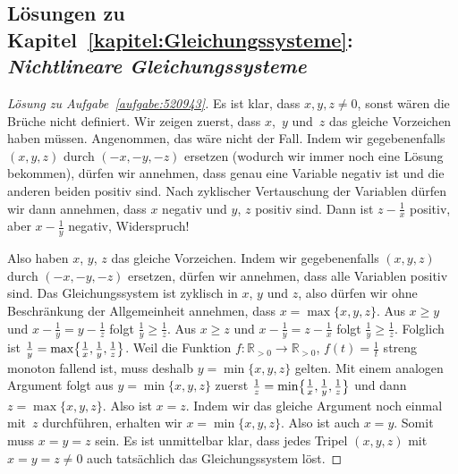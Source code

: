 \subsection*{Lösungen zu Kapitel~\ref{kapitel:Gleichungssysteme}: \emph{Nichtlineare Gleichungssysteme}}

\begin{proof}[Lösung zu Aufgabe~\ref{aufgabe:520943}]
	Es ist klar, dass $x,y,z\neq 0$, sonst wären die Brüche nicht definiert. Wir zeigen zuerst, dass $x$,~$y$ und~$z$ das gleiche Vorzeichen haben müssen. Angenommen, das wäre nicht der Fall. Indem wir gegebenenfalls $(x,y,z)$ durch $(-x,-y,-z)$ ersetzen (wodurch wir immer noch eine Lösung bekommen), dürfen wir annehmen, dass genau eine Variable negativ ist und die anderen beiden positiv sind. Nach zyklischer Vertauschung der Variablen dürfen wir dann annehmen, dass $x$ negativ und $y$, $z$ positiv sind. Dann ist $z-\frac 1x$ positiv, aber $x-\frac 1y$ negativ, Widerspruch!
	
	Also haben $x$, $y$, $z$ das gleiche Vorzeichen. Indem wir gegebenenfalls $(x,y,z)$ durch $(-x,-y,-z)$ ersetzen, dürfen wir annehmen, dass alle Variablen positiv sind. Das Gleichungssystem ist zyklisch in $x$, $y$ und $z$, also dürfen wir ohne Beschränkung der Allgemeinheit annehmen, dass $x=\max\{x,y,z\}$. Aus $x\geqslant y$ und $x-\frac 1y=y-\frac 1z$ folgt $\frac 1y\geqslant \frac 1z$. Aus $x\geqslant z$ und $x-\frac 1y=z-\frac 1x$ folgt $\frac 1y\geqslant \frac 1z$. Folglich ist $\frac 1y=\max\braces[\big]{\frac 1x,\frac 1y,\frac 1z}$. Weil die Funktion $f\colon \mathbb R_{>0}\rightarrow \mathbb R_{>0}$, $f(t)=\frac 1t$ streng monoton fallend ist, muss deshalb $y=\min\{x,y,z\}$ gelten. Mit einem analogen Argument folgt aus $y=\min\{x,y,z\}$ zuerst $\frac 1z=\min\braces[\big]{\frac 1x,\frac 1y,\frac 1z}$ und dann $z=\max\{x,y,z\}$. Also ist $x=z$. Indem wir das gleiche Argument noch einmal mit~$z$ durchführen, erhalten wir $x=\min\{x,y,z\}$. Also ist auch $x=y$. Somit muss $x=y=z$ sein. Es ist unmittelbar klar, dass jedes Tripel $(x,y,z)$ mit $x=y=z\neq 0$ auch tatsächlich das Gleichungssystem löst.
\end{proof}
